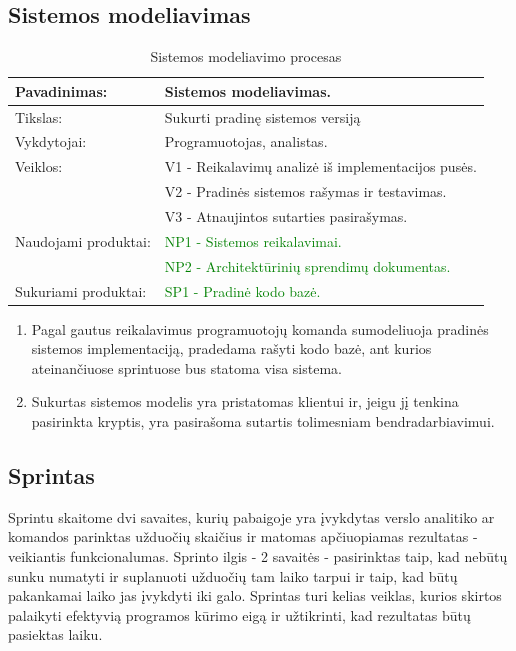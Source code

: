 \documentclass{VUMIFPSkursinis}
\begin{document}
	\newpage

	\subsection{Sistemos modeliavimas}
	\begin{center}
		\begin{table}[ht]
			\caption{Sistemos modeliavimo procesas}
			\begin{tabular}{ | l | l | }
				\hline
				Pavadinimas:		& Sistemos modeliavimas.				\\ \hline
				Tikslas:		& Sukurti pradinę sistemos versiją			\\ \hline
				Vykdytojai:		& Programuotojas, analistas.				\\ \hline
				Veiklos:		& V1 - Reikalavimų analizė iš implementacijos pusės.	\\
							& V2 - Pradinės sistemos rašymas ir testavimas.		\\
							& V3 - Atnaujintos sutarties pasirašymas.		\\ \hline
				Naudojami produktai:	& \textcolor{green}{NP1 - Sistemos reikalavimai. }				\\
							& \textcolor{green}{NP2 - Architektūrinių sprendimų dokumentas.}		\\ \hline
				Sukuriami produktai:	& \textcolor{green}{SP1 - Pradinė kodo bazė. }				\\
			\end{tabular}
		\end{table}
	\end{center}

	\begin{enumerate}
		\item Pagal gautus reikalavimus programuotojų komanda sumodeliuoja pradinės sistemos implementaciją, pradedama rašyti kodo bazė, ant kurios ateinančiuose sprintuose bus statoma visa sistema.
		\item Sukurtas sistemos modelis yra pristatomas klientui ir, jeigu jį tenkina pasirinkta kryptis, yra pasirašoma sutartis tolimesniam bendradarbiavimui.
	\end{enumerate}

	\subsection{Sprintas}
	Sprintu skaitome dvi savaites, kurių pabaigoje yra įvykdytas verslo analitiko ar komandos parinktas užduočių skaičius ir matomas apčiuopiamas rezultatas - veikiantis funkcionalumas.
	Sprinto ilgis - 2 savaitės - pasirinktas taip, kad nebūtų sunku numatyti ir suplanuoti užduočių tam laiko tarpui ir taip, kad būtų pakankamai laiko jas įvykdyti iki galo.
	Sprintas turi kelias veiklas, kurios skirtos palaikyti efektyvią programos kūrimo eigą ir užtikrinti, kad rezultatas būtų pasiektas laiku.
\end{document}
